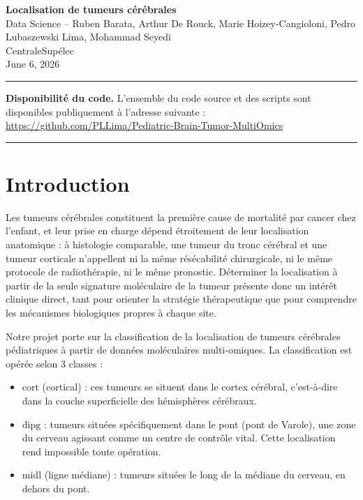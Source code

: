 \documentclass[a4paper,11pt]{paper}
\theoremstyle{plain}
\theoremstyle{definition}
\theoremstyle{remark}
\begin{document}
\begin{center}
    {\huge \bfseries Localisation de tumeurs cérébrales}\\[1em]
    {\Large Data Science – Ruben Barata, Arthur De Rouck, Marie Hoizey-Cangioloni, Pedro Lubaszewski Lima, Mohammad Seyedi}\\[0.5em]
    {CentraleSupélec} \\
    June 6, 2026
\end{center}

\noindent\rule{\textwidth}{0.5pt}
\vspace{1em}
\begin{center}
    \textbf{Disponibilité du code.} L'ensemble du code source et des scripts sont disponibles publiquement à l'adresse suivante :\\ \url{https://github.com/PLLima/Pediatric-Brain-Tumor-MultiOmics}
\end{center}

\vspace{1em}
\noindent\rule{\textwidth}{0.5pt}

\clearpage
\tableofcontents
\clearpage


\newpage

\section{Introduction}

Les tumeurs cérébrales constituent la première cause de mortalité par cancer chez l'enfant, et leur prise en charge dépend étroitement de leur localisation anatomique : à histologie comparable, une tumeur du tronc cérébral et une tumeur corticale n'appellent ni la même résécabilité chirurgicale, ni le même protocole de radiothérapie, ni le même pronostic. Déterminer la localisation à partir de la seule signature moléculaire de la tumeur présente donc un intérêt clinique direct, tant pour orienter la stratégie thérapeutique que pour comprendre les mécanismes biologiques propres à chaque site.

Notre projet porte sur la classification de la localisation de tumeurs cérébrales pédiatriques à partir de données moléculaires multi-omiques. La classification est opérée selon $3$ classes :
\begin{itemize}
    \item $\text{cort}$ (cortical) : ces tumeurs se situent dans le cortex cérébral, c'est-à-dire dans la couche superficielle des hémisphères cérébraux.
    \item $\text{dipg}$ : tumeurs situées spécifiquement dans le pont (pont de Varole), une zone du cerveau agissant comme un centre de contrôle vital. Cette localisation rend impossible toute opération.
    \item $\text{midl}$ (ligne médiane) : tumeurs situées le long de la médiane du cerveau, en dehors du pont.
\end{itemize}
\end{document}
